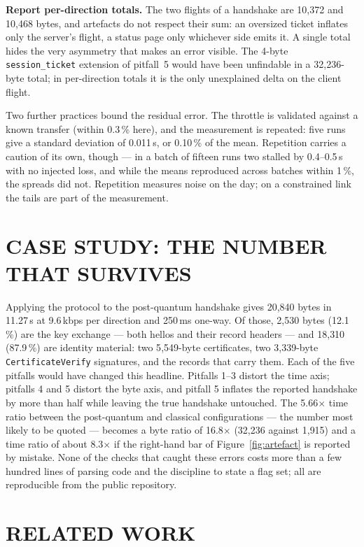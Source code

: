 \documentclass[]{spie}  %
\begin{document}
\textbf{Report per-direction totals.} The two flights of a handshake are
10{,}372 and 10{,}468 bytes, and artefacts do not respect their sum: an
oversized ticket inflates only the server's flight, a status page only
whichever side emits it. A single total hides the very asymmetry that
makes an error visible. The 4-byte \texttt{session\_ticket} extension of
pitfall~5 would have been unfindable in a 32{,}236-byte total; in
per-direction totals it is the only unexplained delta on the client
flight.

Two further practices bound the residual error. The throttle is
validated against a known transfer (within 0.3\,\% here), and the
measurement is repeated: five runs give a standard deviation of 0.011\,s,
or 0.10\,\% of the mean. Repetition carries a caution of its own, though
--- in a batch of fifteen runs two stalled by 0.4--0.5\,s with no
injected loss, and while the means reproduced across batches within
1\,\%, the spreads did not. Repetition measures noise on the day; on a
constrained link the tails are part of the measurement.

\section{CASE STUDY: THE NUMBER THAT SURVIVES}
\label{sec:case}

Applying the protocol to the post-quantum handshake gives 20{,}840 bytes
in 11.27\,s at 9.6\,kbps per direction and 250\,ms one-way. Of those,
2{,}530 bytes (12.1\,\%) are the key exchange --- both hellos and their
record headers --- and 18{,}310 (87.9\,\%) are identity material: two
5{,}549-byte certificates, two 3{,}339-byte \texttt{CertificateVerify}
signatures, and the records that carry them. Each of the five pitfalls
would have changed this headline. Pitfalls 1--3 distort the time axis;
pitfalls 4 and 5 distort the byte axis, and pitfall 5 inflates the
reported handshake by more than half while leaving the true handshake
untouched. The 5.66$\times$ time ratio between the post-quantum and classical
configurations --- the number most likely to be quoted --- becomes a byte
ratio of 16.8$\times$ (32{,}236 against 1{,}915) and a time ratio of
about 8.3$\times$ if the right-hand bar of Figure~\ref{fig:artefact} is
reported by mistake. None of the checks that caught these
errors costs more than a few hundred lines of parsing code and the
discipline to state a flag set; all are reproducible from the public
repository\cite{measurepackage}.

\section{RELATED WORK}
\label{sec:related}
\end{document}
